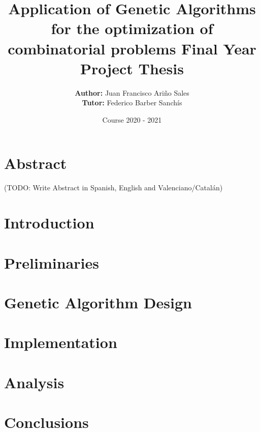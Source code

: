 \documentclass[12pt,twoside]{report}
\title{
	{Application of Genetic Algorithms for the optimization of combinatorial problems}
	{\break \large Final Year Project Thesis}
}
\author{ \textbf{Author:} Juan Francisco Ariño Sales \\ {\large \textbf{Tutor:} Federico Barber Sanchís}}
\date {Course 2020 - 2021}
\begin{document}

\maketitle

\chapter*{Abstract}
\pagestyle{empty}
(TODO: Write Abstract in Spanish, English and Valenciano/Catalán)

\tableofcontents
\pagestyle{empty}

\chapter{Introduction}


\chapter{Preliminaries}


\chapter{Genetic Algorithm Design}


\chapter{Implementation}


\chapter{Analysis}


\chapter{Conclusions}


\appendix

\printbibliography
\end{document}
